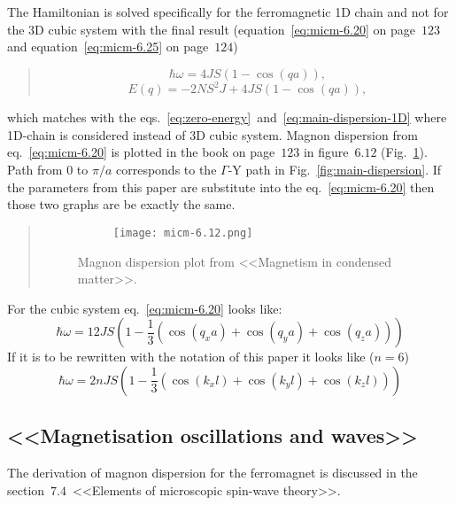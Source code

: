     The Hamiltonian is solved specifically for the ferromagnetic 1D chain and not for the 3D cubic system with the final result (equation~\ref{eq:micm-6.20} on page~$123$ and equation~\ref{eq:micm-6.25} on page~$124$)
    \begin{quote}
        \begin{equation}
            \hbar\omega = 4JS(1 - \cos(qa)), \label{eq:micm-6.20} \tag{6.20}
        \end{equation}
        \begin{equation}
           E(q) = -2NS^2J + 4JS(1 - \cos(qa)), \label{eq:micm-6.25} \tag{6.25}
        \end{equation}
    \end{quote}
    which matches with the eqs.~\eqref{eq:zero-energy}~and~\eqref{eq:main-dispersion-1D} where 1D-chain is considered instead of 3D cubic system. 
    Magnon dispersion from eq.~\eqref{eq:micm-6.20} is plotted in the book on page~$123$ in figure~$6.12$ (Fig.~\ref{fig:micm-6.12}). 
    Path from $0$ to $\pi / a$ corresponds to the $\Gamma$-Y path in Fig.~\ref{fig:main-dispersion}. 
    If the parameters from this paper are substitute into the eq.~\eqref{eq:micm-6.20} then those two graphs are be exactly the same.
    \begin{quote}
        \begin{figure}[H]
            \centering
            \begin{subfigure}[b]{0.5\textwidth}
                \centering
                \texttt{[image: micm-6.12.png]}
            \end{subfigure}
            \hfill
            \caption{Magnon dispersion plot from <<Magnetism in condensed matter>>.}
            \label{fig:micm-6.12}
        \end{figure}
    \end{quote}
    For the cubic system eq.~\ref{eq:micm-6.20} looks like:
    \begin{equation}
        \hbar\omega = 12JS(1 - \dfrac{1}{3}(\cos(q_xa) + \cos(q_ya) + \cos(q_za)))
    \end{equation}
    If it is to be rewritten with the notation of this paper it looks like ($n = 6$)
    \begin{equation}
        \hbar\omega = 2nJS(1 - \dfrac{1}{3}(\cos(k_xl) + \cos(k_yl) + \cos(k_zl)))
    \end{equation}

\subsection{<<Magnetisation oscillations and waves>>\cite{gurevich1996magnetization}}
    The derivation of magnon dispersion for the ferromagnet is discussed in the section~$7.4$~<<Elements of microscopic spin-wave theory>>.

